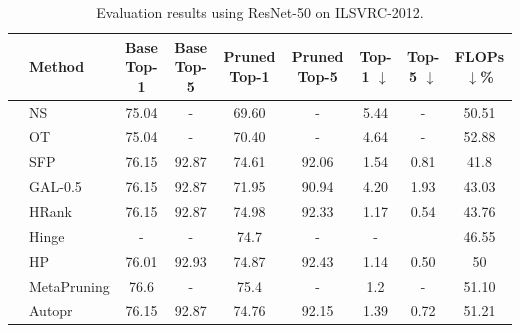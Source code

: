 \documentclass[review]{cvpr}
\begin{document}
  
\begin{table}

	\caption{Evaluation results using ResNet-50 on ILSVRC-2012.}
	\begin{center}
		\begin{small}
			
			\begin{tabular}{llccccccc}
				\toprule
				& Method 							&{Base Top-1}	&{Base Top-5}	&{Pruned Top-1}	&{Pruned Top-5}	& {Top-1 $\downarrow$ }	&	{Top-5 $\downarrow$ }	& 	{FLOPs $\downarrow$\%}	
				
				\\  \midrule  
				
				&   NS \cite{liu2017learning}          &  75.04    &    -      &   69.60   &    -      &    5.44   &  -        &   50.51   \\
				&   OT  \cite{OT}               &  75.04    &    -      &   70.40   &    -      &    4.64   &  -        &   52.88   \\
				&	SFP \cite{he2018soft}	    &	76.15 	&	92.87	&	74.61	&	92.06	&	1.54	&	0.81 	&	41.8	\\
				&GAL-0.5 \cite{GAL}				&	76.15	&	92.87	&	71.95	&	90.94	&	4.20	&	1.93	&	43.03	\\
				&HRank \cite{HRank}				&	76.15	&	92.87	&	74.98	&	92.33	&	1.17	&	0.54	&	43.76	\\
				&Hinge \cite{Hinge}             &     -     &    -      &   74.7    &    -     &     -     &       &  46.55           \\
				&HP \cite{xu2018hybrid}			&	76.01 	&	92.93	&	74.87	&	92.43	&	1.14 	&	0.50 	&	50		\\
				&MetaPruning \cite{Metapruning}	&	76.6	&	-		&	75.4	&	-		&	1.2		&	-		&	51.10	\\
				&Autopr \cite{luo2018autopruner}&	76.15 	&	92.87	&	74.76	&	92.15	&	1.39	&	0.72 	&	51.21	\\

\end{tabular}
\end{small}
\end{center}
\end{table}
\end{document}
